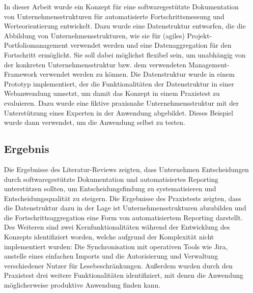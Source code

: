 In dieser Arbeit wurde ein Konzept für eine softwaregestützte Dokumentation von Unternehmensstrukturen für automatisierte Fortschrittsmessung und Werteorientierung entwickelt. Dazu wurde eine Datenstruktur entworfen, die die Abbildung von Unternehmensstrukturen, wie sie für (agiles) Projekt-Portfoliomanagement verwendet werden und eine Datenaggregation für den Fortschritt ermöglicht. Sie soll dabei möglichst flexibel sein, um unabhängig von der konkreten Unternehmensstruktur bzw. dem verwendeten Management-Framework verwendet werden zu können. Die Datenstruktur wurde in einem Prototyp implementiert, der die Funktionalitäten der Datenstruktur in einer Webanwendung umsetzt, um damit das Konzept in einem Praxistest zu evaluieren. Dazu wurde eine fiktive praxisnahe Unternehmensstruktur mit der Unterstützung eines Experten in der Anwendung abgebildet. Dieses Beispiel wurde dann verwendet, um die Anwendung selbst zu testen.

\subsection{Ergebnis}
Die Ergebnisse des Literatur-Reviews zeigten, dass Unternehmen Entscheidungen durch softwaregestützte Dokumentation und automatisiertes Reporting unterstützen sollten, um Entscheidungsfindung zu systematisieren und Entscheidungsqualität zu steigern. Die Ergebnisse des Praxistests zeigten, dass die Datenstruktur dazu in der Lage ist Unternehmensstrukturen abzubilden und die Fortschrittsaggregation eine Form von automatisiertem Reporting darstellt. Des Weiteren sind zwei Kernfunktionalitäten während der Entwicklung des Konzepts identifiziert worden, welche aufgrund der Komplexität nicht implementiert wurden: Die Synchronisation mit operativen Tools wie Jira, anstelle eines einfachen Imports und die Autorisierung und Verwaltung verschiedener Nutzer für Lesebeschränkungen. Außerdem wurden durch den Praxistest drei weitere Funktionalitäten identifiziert, mit denen die Anwendung möglicherweise produktive Anwendung finden kann.

